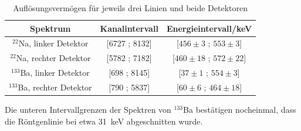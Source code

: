 \begin{table}[h]
\centering
\caption{Auflösungsvermögen für jeweils drei Linien und beide Detektoren}
\label{tab:intervalle}
\begin{tabular}{ccc}
\toprule
Spektrum & Kanalintervall & Energieintervall/\si{\kilo\electronvolt}\\
\midrule
$^{22}$Na, linker Detektor & [6727 ; 8132] &[$456 \pm 3$ ; $553 \pm 3$]\\ 
$^{22}$Na, rechter Detektor & [5782 ; 7182] & [$460 \pm 18$ ; $572 \pm 22$]\\
$^{133}$Ba, linker Detektor & [698 ; 8145] &[$37 \pm 1$ ; $554 \pm 3$]\\ 
$^{133}$Ba, rechter Detektor & [790 ; 5837] & [$60 \pm 6$ ; $464 \pm 18$]\\
\bottomrule
\end{tabular}
\end{table}

Die unteren Intervallgrenzen der Spektren von $^{133}$Ba bestätigen nocheinmal, dass die Röntgenlinie bei etwa \SI{31}{\kilo\electronvolt} abgeschnitten wurde.
